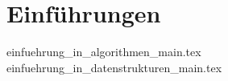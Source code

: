 
\part{Einführungen}
\label{part-einfuehrungen}
{einfuehrung_in_algorithmen_main.tex}
{einfuehrung_in_datenstrukturen_main.tex}


